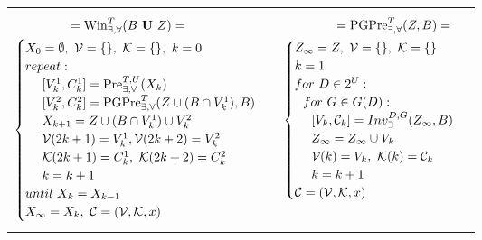 \begin{table}
	\footnotesize
	\begin{tabular}{ll}
		\begin{minipage}{.5\textwidth}
			\begin{align}
			[X_{\infty},\mathcal{C}]= \text{Win}_{\exists,\forall}^{T} (B\mathbf{\ U\ }Z)=\quad\quad\quad\quad\quad\quad\ \ \nonumber\\
			\begin{cases}
			X_0 = \emptyset,\ \mathcal{V}=\{\},\ \mathcal{K}=\{\},\ {\color{black} k=0}\\
			{\color{black} repeat:}\\
			\ \ \ \ [V^1_k,C^1_k]=
			\text{Pre}_{\exists,\forall}^{T,U}(X_k)\\
			\ \ \ \  [V^2_k,C^2_k]=\text{PGPre}_{\exists,\forall}^{T}(Z\cup(B\cap V^1_k),B)\\
			\ \ \ \ X_{k+1} =Z\cup (B\cap V^1_k)\cup V^2_k\\
			\ \ \ \ \mathcal{V}(2k+1)=V^1_k, \mathcal{V}(2k+2)=V^2_k\\
			\ \ \ \ \mathcal{K}(2k+1)=C^1_k,\ \mathcal{K}(2k+2)=C^2_k\\
			\ \ \ \ {\color{black} k=k+1}\\
			{\color{black} until \ X_{k}= X_{k-1} }\\
			X_{\infty}=X_k,\ \mathcal{C} = (\mathcal{V},\mathcal{K},x)
			\end{cases}\label{win-until}
			\end{align}
		\end{minipage} &
		\begin{minipage}{.5\textwidth}
			\begin{align}
			[Z_{\infty},\mathcal{C}]=\text{PGPre}_{\exists,\forall}^{T} (Z,B)=\quad \ \nonumber\\
			\begin{cases}
			Z_{\infty} = Z,\ \mathcal{V} = \{\},\ \mathcal{K}=\{\}\\ k = 1\\
			for\ D\in 2^U:\\
			\ \ for\ G\in G(D):\\
			\ \ \ \ [V_k,\mathcal{C}_k]=Inv_{\exists}^{D,G}(Z_{\infty},B)\\
			\ \ \ \  Z_{\infty} = Z_{\infty} \cup V_k\\
			\ \ \ \  \mathcal{V}(k)=V_k,\ \mathcal{K}(k)=\mathcal{C}_k\\
			\ \ \ \  {\color{black} k = k+1}\\
			\mathcal{C} = (\mathcal{V},\mathcal{K},x)
			\end{cases}\label{win-pgpre}
			\end{align}
		\end{minipage} 
	\end{tabular} 
\end{table}

